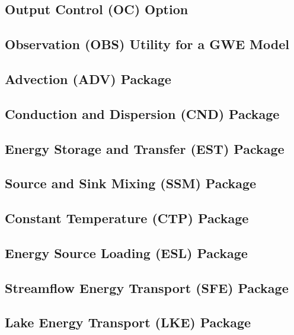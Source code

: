 \newpage
\subsection{Output Control (OC) Option}


\newpage
\subsection{Observation (OBS) Utility for a GWE Model}


\newpage
\subsection{Advection (ADV) Package}


\newpage
\subsection{Conduction and Dispersion (CND) Package}


\newpage
\subsection{Energy Storage and Transfer (EST) Package}


\newpage
\subsection{Source and Sink Mixing (SSM) Package}


\newpage
\subsection{Constant Temperature (CTP) Package}


\newpage
\subsection{Energy Source Loading (ESL) Package}


\newpage
\subsection{Streamflow Energy Transport (SFE) Package}


\newpage
\subsection{Lake Energy Transport (LKE) Package}


